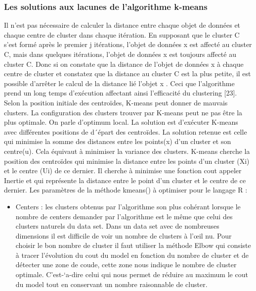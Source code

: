 \subsubsection{Les solutions aux lacunes de l’algorithme k-means}

Il n’est pas nécessaire de calculer la distance entre chaque objet de données et chaque centre de cluster dans chaque itération. En supposant que le cluster C s'est formé après le premier j itérations, l'objet de données x est affecté au cluster C, mais dans quelques itérations, l'objet de données x est toujours affecté au cluster C. Donc si on constate que la distance de l'objet de données x à chaque centre de cluster et constatez que la distance au cluster C  est la plus petite, il est possible d’arrêter le calcul de la distance lié l’objet x . 
Ceci que l’algorithme prend un long temps d'exécution affectant ainsi l'efficacité du clustering [23]. \\

Selon la position initiale des centroïdes, K-means peut donner de mauvais clusters. La configuration des clusters trouver par K-means peut ne pas être la plus optimale. On parle d’optimum local. La solution est d’exécuter K-means avec différentes positions de d´épart des centroïdes. La solution retenue est celle qui minimise la somme des distances entre les points(x) d’un cluster et son centre(u). Cela équivaut à minimiser la variance des clusters. K-means cherche la position des centroïdes qui minimise la distance entre les points
d’un cluster (Xi) et le centre (Ui) de ce dernier. Il cherche à minimise une fonction cout appeler Inertie et qui représente la distance entre le point d’un cluster et le centre de ce dernier. Les paramètres de la méthode kmeans() à optimiser pour le langage R :

\begin{itemize}
	\item  Centers : les clusters obtenus par l’algorithme son plus cohérant lorsque le nombre de centers demander par l’algorithme est le même que celui des clusters naturels du data set. Dans un data set avec de nombreuses dimensions il est difficile de voir un nombre de clusters à l’œil nu. Pour choisir le bon nombre de cluster il faut utiliser la méthode Elbow qui consiste à tracer l’évolution du cout du model en fonction du nombre de cluster et de détecter une zone de coude, cette zone nous indique le nombre de cluster optimale. C’est-`a-dire celui qui nous permet de réduire au maximum le cout du model tout en conservant un nombre raisonnable de cluster.
\end{itemize}


